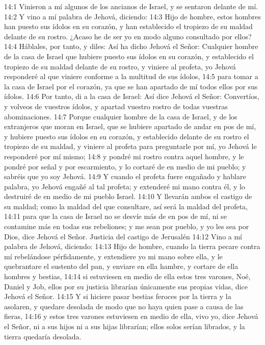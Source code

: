 14:1 Vinieron a mí algunos de los ancianos de Israel, y se sentaron delante de mí.   
14:2 Y vino a mí palabra de Jehová, diciendo:   
14:3 Hijo de hombre, estos hombres han puesto sus ídolos en su corazón, y han establecido el tropiezo de su maldad delante de su rostro. ¿Acaso he de ser yo en modo alguno consultado por ellos?   
14:4 Háblales, por tanto, y diles: Así ha dicho Jehová el Señor: Cualquier hombre de la casa de Israel que hubiere puesto sus ídolos en su corazón, y establecido el tropiezo de su maldad delante de su rostro, y viniere al profeta, yo Jehová responderé al que viniere conforme a la multitud de sus ídolos,   
14:5 para tomar a la casa de Israel por el corazón, ya que se han apartado de mí todos ellos por sus ídolos.   
14:6 Por tanto, di a la casa de Israel: Así dice Jehová el Señor: Convertíos, y volveos de vuestros ídolos, y apartad vuestro rostro de todas vuestras abominaciones.   
14:7 Porque cualquier hombre de la casa de Israel, y de los extranjeros que moran en Israel, que se hubiere apartado de andar en pos de mí, y hubiere puesto sus ídolos en su corazón, y establecido delante de su rostro el tropiezo de su maldad, y viniere al profeta para preguntarle por mí, yo Jehová le responderé por mí mismo;   
14:8 y pondré mi rostro contra aquel hombre, y le pondré por señal y por escarmiento, y lo cortaré de en medio de mi pueblo; y sabréis que yo soy Jehová.   
14:9 Y cuando el profeta fuere engañado y hablare palabra, yo Jehová engañé al tal profeta; y extenderé mi mano contra él, y lo destruiré de en medio de mi pueblo Israel.   
14:10 Y llevarán ambos el castigo de su maldad; como la maldad del que consultare, así será la maldad del profeta,   
14:11 para que la casa de Israel no se desvíe más de en pos de mí, ni se contamine más en todas sus rebeliones; y me sean por pueblo, y yo les sea por Dios, dice Jehová el Señor.   
Justicia del castigo de Jerusalén   
14:12 Vino a mí palabra de Jehová, diciendo:   
14:13 Hijo de hombre, cuando la tierra pecare contra mí rebelándose pérfidamente, y extendiere yo mi mano sobre ella, y le quebrantare el sustento del pan, y enviare en ella hambre, y cortare de ella hombres y bestias,   
14:14 si estuviesen en medio de ella estos tres varones, Noé, Daniel y Job, ellos por su justicia librarían únicamente sus propias vidas, dice Jehová el Señor.   
14:15 Y si hiciere pasar bestias feroces por la tierra y la asolaren, y quedare desolada de modo que no haya quien pase a causa de las fieras,   
14:16 y estos tres varones estuviesen en medio de ella, vivo yo, dice Jehová el Señor, ni a sus hijos ni a sus hijas librarían; ellos solos serían librados, y la tierra quedaría desolada.   
